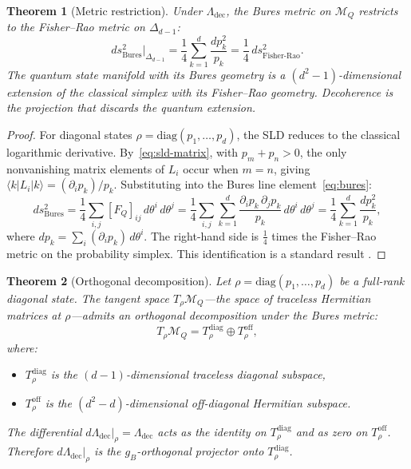 \documentclass[12pt,a4paper]{article}
\newtheorem{theorem}{Theorem}[section]
\theoremstyle{definition}
\theoremstyle{remark}
\begin{document}
\begin{theorem}[Metric restriction]
\label{thm:metric-restriction}
Under $\Lambda_{\mathrm{dec}}$, the Bures metric on $\mathcal{M}_Q$ restricts to the Fisher--Rao metric on $\Delta_{d-1}$:
\begin{equation}
\label{eq:metric-restriction}
ds^2_{\mathrm{Bures}}\big|_{\Delta_{d-1}} = \frac{1}{4} \sum_{k=1}^d \frac{dp_k^2}{p_k} = \frac{1}{4}\, ds^2_{\mathrm{Fisher\text{-}Rao}}.
\end{equation}
The quantum state manifold with its Bures geometry is a $(d^2 - 1)$-dimensional extension of the classical simplex with its Fisher--Rao geometry. Decoherence is the projection that discards the quantum extension.
\end{theorem}

\begin{proof}
For diagonal states $\rho = \mathrm{diag}(p_1, \ldots, p_d)$, the SLD reduces to the classical logarithmic derivative. By~\eqref{eq:sld-matrix}, with $p_m + p_n > 0$, the only nonvanishing matrix elements of $L_i$ occur when $m = n$, giving $\langle k | L_i | k \rangle = (\partial_i p_k) / p_k$. Substituting into the Bures line element~\eqref{eq:bures}:
\[
ds^2_{\mathrm{Bures}} = \frac{1}{4} \sum_{i,j} [F_Q]_{ij}\, d\theta^i\, d\theta^j = \frac{1}{4} \sum_{i,j} \sum_{k=1}^d \frac{\partial_i p_k\, \partial_j p_k}{p_k}\, d\theta^i\, d\theta^j = \frac{1}{4} \sum_{k=1}^d \frac{dp_k^2}{p_k},
\]
where $dp_k = \sum_i (\partial_i p_k)\, d\theta^i$. The right-hand side is $\frac{1}{4}$ times the Fisher--Rao metric on the probability simplex. This identification is a standard result \cite{braunstein1994statistical}.
\end{proof}

\begin{theorem}[Orthogonal decomposition]
\label{thm:orthogonal-decomposition}
Let $\rho = \mathrm{diag}(p_1, \ldots, p_d)$ be a full-rank diagonal state.  The tangent space $T_\rho \mathcal{M}_Q$---the space of traceless Hermitian matrices at $\rho$---admits an orthogonal decomposition under the Bures metric:
\begin{equation}
\label{eq:orthogonal-decomposition}
T_\rho \mathcal{M}_Q = T_\rho^{\mathrm{diag}} \oplus T_\rho^{\mathrm{off}},
\end{equation}
where:
\begin{itemize}
\item $T_\rho^{\mathrm{diag}}$ is the $(d-1)$-dimensional traceless diagonal subspace,
\item $T_\rho^{\mathrm{off}}$ is the $(d^2-d)$-dimensional off-diagonal Hermitian subspace.
\end{itemize}
The differential $d\Lambda_{\mathrm{dec}}|_\rho = \Lambda_{\mathrm{dec}}$ acts as the identity on $T_\rho^{\mathrm{diag}}$ and as zero on $T_\rho^{\mathrm{off}}$.  Therefore $d\Lambda_{\mathrm{dec}}|_\rho$ is the $g_B$-orthogonal projector onto $T_\rho^{\mathrm{diag}}$.
\end{theorem}
\end{document}
